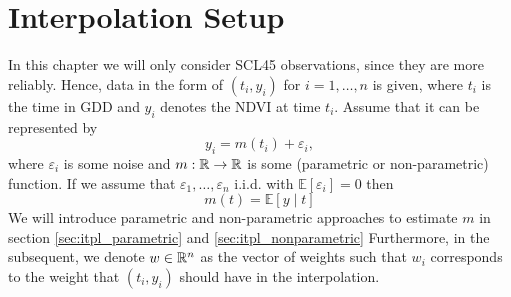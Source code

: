 \section{Interpolation Setup}{\label{sec:itpl_setup}
	In this chapter we will only consider SCL45 observations, since they are more reliably. Hence, data in the form of $\left(t_{i}, y_{i}\right)$ for $i=1, \ldots, n$ is given, where $t_i$ is the time in GDD and $y_i$ denotes the NDVI at time $t_i$. Assume that it can be represented by
	$$
		y_{i}=m\left(t_{i}\right)+\varepsilon_{i},
	$$
	where $\varepsilon_i$ is some noise and $m: \mathbb{R} \rightarrow \mathbb{R}$ is some (parametric or non-parametric) function. If we assume that $\varepsilon_{1}, \ldots, \varepsilon_{n}$ i.i.d. with $\mathbb{E}\left[\varepsilon_{i}\right]=0$ then 
	$$
		m(t)=\mathbb{E}[y \mid t]
	$$
	We will introduce parametric and non-parametric approaches to estimate $m$ in section \ref{sec:itpl_parametric} and \ref{sec:itpl_nonparametric}
	Furthermore, in the subsequent, we denote $w\in \mathbb{R}^n$ as the vector of weights such that $w_i$ corresponds to the weight that $(t_i, y_i)$ should have in the interpolation. 
}








